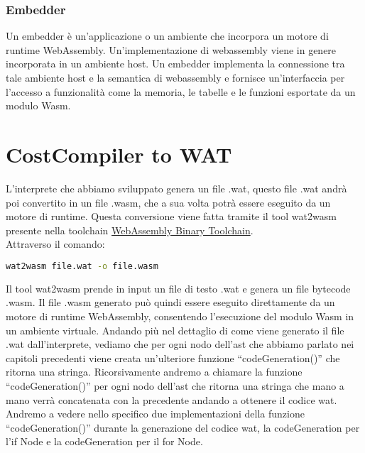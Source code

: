 \documentclass[../../main.tex]{subfiles}
\begin{document}
\subsubsection{Embedder}
Un embedder è un'applicazione o un ambiente che incorpora un motore di runtime WebAssembly. Un'implementazione di webassembly viene in genere incorporata in un ambiente host.
Un embedder implementa la connessione tra tale ambiente host e la semantica di webassembly e fornisce un'interfaccia per l'accesso a funzionalità come la memoria, le tabelle e le funzioni esportate da un modulo Wasm.\autocite{amslaurea20464}\autocite{DBLP:journals/corr/abs-2205-01183}

\section{CostCompiler to WAT}
\label{sec:codeGeneration}
L'interprete che abbiamo sviluppato genera un file .wat, questo file .wat andrà poi convertito in un file .wasm, che a sua volta potrà essere eseguito da un motore di runtime.
Questa conversione viene fatta tramite il tool wat2wasm presente nella toolchain \href{https://github.com/WebAssembly/wabt}{WebAssembly Binary Toolchain}. \autocite{jain2022webassembly}\\
Attraverso il comando:
\begin{lstlisting}[language=bash]
    wat2wasm file.wat -o file.wasm
\end{lstlisting}
Il tool wat2wasm prende in input un file di testo .wat e genera un file bytecode .wasm. Il file .wasm generato può quindi essere eseguito direttamente da un motore di runtime WebAssembly, consentendo l'esecuzione del modulo Wasm in un ambiente virtuale.
Andando più nel dettaglio di come viene generato il file .wat dall'interprete, vediamo che per ogni nodo dell'ast che abbiamo parlato nei capitoli precedenti viene creata un'ulteriore funzione ``codeGeneration()'' che ritorna una stringa.
Ricorsivamente andremo a chiamare la funzione ``codeGeneration()'' per ogni nodo dell'ast che ritorna una stringa che mano a mano verrà concatenata con la precedente andando a ottenere il codice wat.
Andremo a vedere nello specifico due implementazioni della funzione ``codeGeneration()'' durante la generazione del codice wat, la codeGeneration per l'if Node e la codeGeneration per il for Node.
\end{document}
